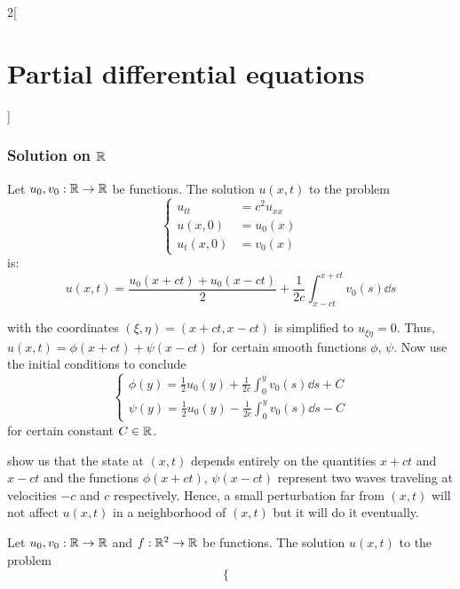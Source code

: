 \documentclass[../../../main_math.tex]{subfiles}
\begin{document}
\begin{multicols}{2}[\section{Partial differential equations}]
  \subsubsection{Solution on \texorpdfstring{$\mathbb{R}$}{R}}
  \begin{proposition}\label{PDE:dAlembert}
    Let $u_0,v_0:\mathbb{R}\rightarrow\mathbb{R}$ be functions. The solution $u(x,t)$ to the problem
    \begin{equation*}
      \left\{
      \begin{aligned}
        u_{tt}   & =c^2u_{xx} \\
        u(x,0)   & =u_0(x)    \\
        u_t(x,0) & =v_0(x)
      \end{aligned}
      \right.
    \end{equation*} is:
    \begin{equation}
      u(x,t)=\frac{u_0(x+ct)+u_0(x-ct)}{2}+\frac{1}{2c}\int_{x-ct}^{x+ct}v_0(s)\dd{s}
    \end{equation}
  \end{proposition}
  \begin{sproof}
     with the coordinates $(\xi, \eta) = (x+ ct,x-ct)$ is simplified to $u_{\xi\eta}=0$. Thus, $u(x,t)=\phi(x+ct)+\psi(x-ct)$ for certain smooth functions $\phi$, $\psi$. Now use the initial conditions to conclude
    $$
      \begin{cases}
        \displaystyle \phi(y)=\frac{1}{2}u_0(y)+\frac{1}{2c}\int_0^yv_0(s)\dd{s}+C \\
        \displaystyle \psi(y) = \frac{1}{2}u_0(y)-\frac{1}{2c}\int_0^yv_0(s)\dd{s}-C
      \end{cases}
    $$
    for certain constant $C\in\mathbb{R}$.
  \end{sproof}
  \begin{remark}
     show us that the state at $(x,t)$ depends entirely on the quantities $x+ct$ and $x-ct$ and the functions $\phi(x+ct)$, $\psi(x-ct)$ represent two waves traveling at velocities $-c$ and $c$ respectively. Hence, a small perturbation far from $(x,t)$ will not affect $u(x,t)$ in a neighborhood of $(x,t)$ but it will do it eventually.
  \end{remark}
  \begin{theorem}
    Let $u_0,v_0:\mathbb{R}\rightarrow\mathbb{R}$ and $f:\mathbb{R}^2\rightarrow\mathbb{R}$ be functions. The solution $u(x,t)$ to the problem
    \begin{equation}\label{PDE:waveeqdriven}
      \left\{
      \begin{aligned}

\end{aligned}
\end{equation}
\end{theorem}
\end{multicols}
\end{document}
